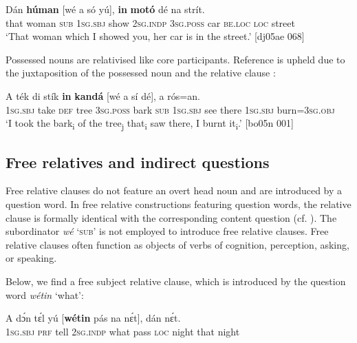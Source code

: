 \ea%
    \label{ex:key:1448}
    \gll Dán  \textbf{húman}  [wé  a    só    yú],    \textbf{in}      \textbf{motó}  dé    na  strít.\\
that  woman   \phantom{[}\textsc{sub}  \textsc{1sg.sbj}  show  \textsc{2sg.indp}  \textsc{3sg.poss}    car    \textsc{be.loc}  \textsc{loc}  street\\

\glt ‘That woman which I showed you, her car is in the street.’ [dj05ae 068]
\z

Possessed nouns are relativised like core participants. Reference is upheld due to the juxtaposition of the possessed noun and the relative clause :


\ea%
    \label{ex:key:1449}
    \gll \MakeUppercase{A}   ték    di  stík    \textbf{in}    \textbf{kandá}  [wé  a    sí  dé],
a    rós=an.\\
\textsc{1sg.sbj} take \textsc{def} tree    \textsc{3sg.poss} bark  \phantom{[}\textsc{sub}  \textsc{1sg.sbj} see there 
\textsc{1sg.sbj}  burn=\textsc{3sg.obj}\\

\glt ‘I took the bark\textsubscript{i} of the tree\textsubscript{j} that\textsubscript{i} saw there, I burnt it\textsubscript{i}.’ [bo05n 001]
\z

\subsection{Free relatives and indirect questions}\label{sec:10.6.5}

Free relative clauses do not feature an overt head noun and are introduced by a question word. In free relative constructions featuring question words, the relative clause is formally identical with the corresponding content question (cf. ). The subordinator \textit{wé} ‘\textsc{sub’} is not employed to introduce free relative clauses. Free relative clauses often function as objects of verbs of cognition, perception, asking, or speaking. 


Below, we find a free subject relative clause, which is introduced by the question word \textit{wétin} ‘what’:



\ea%
    \label{ex:key:1450}
    \gll A    dɔ́n    tɛ́l  yú    [\textbf{wétin}  pás    na  nɛ́t],    dán    nɛ́t.\\
\textsc{1sg.sbj}  \textsc{prf}    tell  \textsc{2sg.indp}   \phantom{[}what  pass    \textsc{loc}  night  that    night\\

